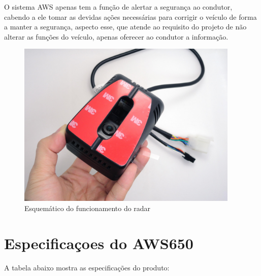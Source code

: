 O sistema AWS apenas tem a função de alertar a segurança ao condutor, cabendo a ele tomar as devidas ações necessárias para corrigir o veículo de forma a manter a segurança, aspecto esse, que atende ao requisito do projeto de não alterar as funções do veículo, apenas oferecer ao condutor a informação.

\begin{figure}[h]
  \centering
  \includegraphics[width=400px, scale=1]{figuras/dispositivo_AWS650}
  \caption{Esquemático do funcionamento do radar}
\label{fig:dispositivo_AWS650}
\end{figure}

\section{Especificaçoes do AWS650}

A tabela abaixo mostra as especificações do produto:

